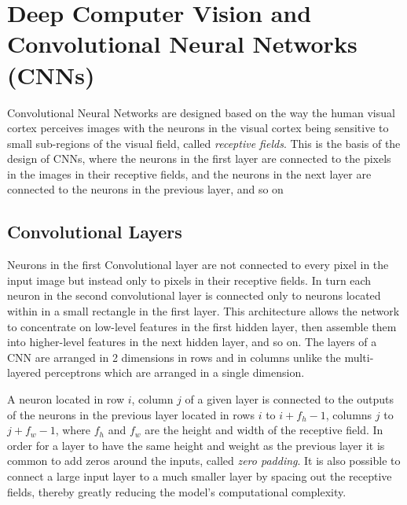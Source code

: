 \documentclass[12pt letter]{report}
\makeatletter
\newcommand{\boxspacing}{\kern\kvtcb@left@rule\kern\kvtcb@boxsep}
\newcommand{\prompt}[4]{
        {\ttfamily\llap{{\color{#2}[#3]:\hspace{3pt}#4}}\vspace{-\baselineskip}}
    }
\makeatother
\begin{document}
    \begin{tcolorbox}[breakable, size=fbox, boxrule=1pt, pad at break*=1mm,colback=cellbackground, colframe=cellborder]
\prompt{In}{incolor}{ }{\boxspacing}
\begin{Verbatim}[commandchars=\\\{\}]

\end{Verbatim}
\end{tcolorbox}

\chapter{Deep Computer Vision and Convolutional Neural Networks
(CNNs)}\label{deep-computer-vision-and-convolutional-neural-networks-cnns}

Convolutional Neural Networks are designed based on the way the human
visual cortex perceives images with the neurons in the visual cortex
being sensitive to small sub-regions of the visual field, called
\emph{receptive fields}. This is the basis of the design of CNNs, where
the neurons in the first layer are connected to the pixels in the images
in their receptive fields, and the neurons in the next layer are
connected to the neurons in the previous layer, and so on

\section{Convolutional Layers}\label{convolutional-layers}

Neurons in the first Convolutional layer are not connected to every
pixel in the input image but instead only to pixels in their receptive
fields. In turn each neuron in the second convolutional layer is
connected only to neurons located within in a small rectangle in the
first layer. This architecture allows the network to concentrate on
low-level features in the first hidden layer, then assemble them into
higher-level features in the next hidden layer, and so on. The layers of
a CNN are arranged in 2 dimensions in rows and in columns unlike the
multi-layered perceptrons which are arranged in a single dimension.

A neuron located in row \(i\), column \(j\) of a given layer is
connected to the outputs of the neurons in the previous layer located in
rows \(i\) to \(i + f_h - 1\), columns \(j\) to \(j + f_w - 1\), where
\(f_h\) and \(f_w\) are the height and width of the receptive field. In
order for a layer to have the same height and weight as the previous
layer it is common to add zeros around the inputs, called \emph{zero
padding}. It is also possible to connect a large input layer to a much
smaller layer by spacing out the receptive fields, thereby greatly
reducing the model's computational complexity.
\end{document}
